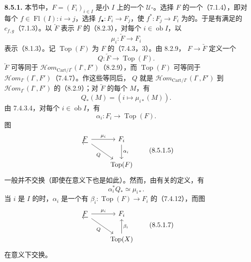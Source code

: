 \textbf{8.5.1.} 本节中，$F=(F_i)_{i\in I}$ 是小 $I$ 上的一个 $\mathcal U$-。选择 $F$ 的一个（7.1.4），即对每个 $f\in\operatorname{Fl}(I):i\to j$，选择 $f_\bullet:F_i\to F_j$，使 $f^*:F_j\to F_i$ 为的。于是有满足的 $c_{f,g}$（7.1.3）。以 $\underleftarrow F$ 表示 $F$ 的（8.2.3），对每个 $i\in\operatorname{ob}I$，以
\[
 \mu_i:\underleftarrow F\longrightarrow F_i\tag{8.5.1.1}
\]
表示（8.1.3）。记 $\operatorname{Top}(F)$ 为 $F$ 的（7.4.3，3）。由 8.2.9， $F\to\underrightarrow F$ 定义一个
\[
 Q:\underleftarrow F\longrightarrow\operatorname{Top}(F).\tag{8.5.1.2}
\]
 $\underleftarrow F$ 可等同于 $\mathscr{H}\!om_{\mathrm{Cart}/I^\circ}(I^\circ,F')$（8.2.9），而 $\operatorname{Top}(F)$ 可等同于 $\mathscr{H}\!om_{I^\circ}(I^\circ,F')$（7.4.7）。作这些等同后， $Q$ 就是 $\mathscr{H}\!om_{\mathrm{Cart}/I^\circ}(I^\circ,F')$ 到 $\mathscr{H}\!om_{I^\circ}(I^\circ,F')$ 的（8.2.9）；对 $\underleftarrow F$ 的每个 $M$，有
\[
 Q_*(M)=(i\longmapsto\mu_{i*}(M)).\tag{8.5.1.3}
\]
由 7.4.3.4，对每个 $i\in\operatorname{ob}I$，有
\[
 \alpha_i:F_i\longrightarrow\operatorname{Top}(F).\tag{8.5.1.4}
\]
图
\[
\begin{tikzcd}
\underleftarrow F\arrow[r,"\mu_i"]\arrow[dr,"Q"']&F_i\arrow[d,"\alpha_i"]\\
&\operatorname{Top}(F)
\end{tikzcd}\tag{8.5.1.5}
\]
一般并不交换（即使在意义下也是如此）。然而，由有关的定义，有
\[
 \alpha_i^*Q_*\simeq\mu_{i*}.\tag{8.5.1.6}
\]
当 $i$ 是 $I$ 的时，$\alpha_i$ 是一个有 $\beta_i:\operatorname{Top}(F)\to F_i$ 的（7.4.12），而图
\[
\begin{tikzcd}
\underleftarrow F\arrow[r,"\mu_i"]\arrow[dr,"Q"']&F_i\\
&\operatorname{Top}(X)\arrow[u,"\beta_i"']
\end{tikzcd}\tag{8.5.1.7}
\]
在意义下交换。

